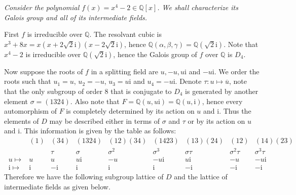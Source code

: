 \begin{example}\em
Consider the polynomial $f(x)=x^4-2\in\mathbb{Q}[x]$. We shall characterize its Galois group and all of its intermediate fields.\par
First $f$ is irreducible over $\mathbb{Q}$. The resolvant cubic is $x^3+8x=x(x+2\sqrt{2}\mathrm{i})(x-2\sqrt{2}\mathrm{i})$, hence $\mathbb{Q}(\alpha,\beta,\gamma)=\mathbb{Q}(\sqrt{2}\mathrm{i})$. Note that $x^4-2$ is irreducible over $\mathbb{Q}(\sqrt{2}\mathrm{i})$, hence the Galois group of $f$ over $\mathbb{Q}$ is $D_4$.\par
Now suppose the roots of $f$ in a splitting field are $u,-u,u\mathrm{i}$ and $-u\mathrm{i}$. We order the roots such that $u_1=u$, $u_2=-u$, $u_3=u\mathrm{i}$ and $u_4=-u\mathrm{i}$. Denote $\tau:u\mapsto\overline{u}$, note that the only subgroup of order $8$ that is conjugate to $D_4$ is generated by another element $\sigma=(1324)$. Also note that $F=\mathbb{Q}(u,u\mathrm{i})=\mathbb{Q}(u,\mathrm{i})$, hence every automorphism of $F$ is completely determined by its action on $u$ and $\mathrm{i}$. Thus the elements of $D$ may be described either in terms of $\sigma$ and $\tau$ or by its action on $u$ and $\mathrm{i}$. This information is given by the table as follows: 
\begin{equation}
\ \begin{array}{ c|c|c|c|c|c|c|c|c }
 & ( 1) & ( 34) & ( 1324) & ( 12)( 34) & ( 1423) & ( 13)( 24) & ( 12) & ( 14)( 23)\\
 &  & \tau  & \sigma  & \sigma ^{2} & \sigma ^{3} & \sigma \tau  & \sigma ^{2} \tau  & \sigma ^{3} \tau \\
\hline
u\mapsto  & u & u & u\mathrm{i} & -u & -u\mathrm{i} & u\mathrm{i} & -u & -u\mathrm{i}\\
\mathrm{i} \mapsto  & \mathrm{i} & -\mathrm{i} & \mathrm{i} & \mathrm{i} & \mathrm{i} & -\mathrm{i} & -\mathrm{i} & -\mathrm{i}
\end{array}
\end{equation}
Therefore we have the following subgroup lattice of $D$ and the lattice of intermediate fields as given below.\par
\begin{figure}[htbp]
    \center

\end{figure}
\end{example}
